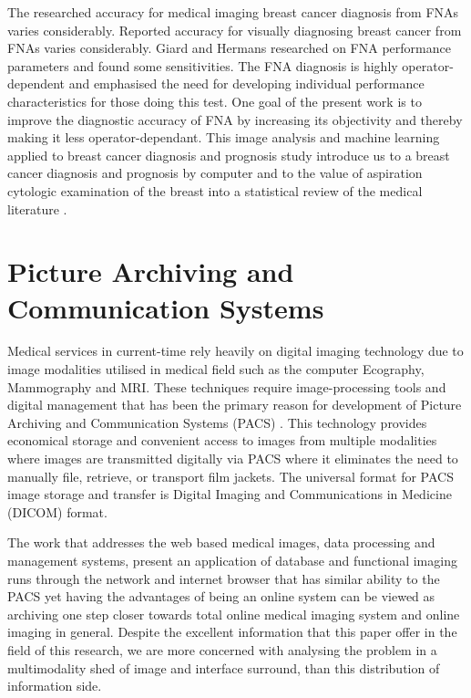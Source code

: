 \clearpage

The researched accuracy for medical imaging breast cancer diagnosis from FNAs varies considerably. Reported accuracy for visually diagnosing breast cancer from FNAs varies considerably. Giard and Hermans \cite{Robertson04scalablefabric} researched on FNA performance parameters and found some sensitivities. The FNA diagnosis is highly operator-dependent and emphasised the need for developing individual performance characteristics for those doing this test. One goal of the present work is to improve the diagnostic accuracy of FNA by increasing its objectivity and thereby making it less operator-dependant. This image analysis and machine learning applied to breast cancer diagnosis and prognosis \cite{citeulike:4920996} study introduce us to a breast cancer diagnosis and prognosis by computer and to the value of aspiration cytologic examination of the breast into a statistical review of the medical literature \cite{Robertson04scalablefabric:}.

\section{Picture Archiving and Communication Systems}

Medical services in current-time rely heavily on digital imaging technology due to image modalities utilised in medical field such as the computer Ecography, Mammography and \gls{MRI}. These techniques require image-processing tools and digital management that has been the primary reason for development of Picture Archiving and Communication Systems (PACS) \cite{oosterwijk2004pacs}. This technology provides economical storage and convenient access to images from multiple modalities where images are transmitted digitally via PACS where it eliminates the need to manually file, retrieve, or transport film jackets. The universal format for PACS image storage and transfer is Digital Imaging and Communications in Medicine (DICOM) \cite{mustra2008overview} format.

The work that addresses the web based medical images, data processing and management systems, present an application of database and functional imaging \cite{kim2000web} runs through the network and internet browser that has similar ability to the PACS yet having the advantages of being an online system can be viewed as archiving one step closer towards total online medical imaging system and online imaging in general. Despite the excellent information that this paper offer in the field of this research, we are more concerned with analysing the problem in a multimodality shed of image and interface surround, than this distribution of information side.

